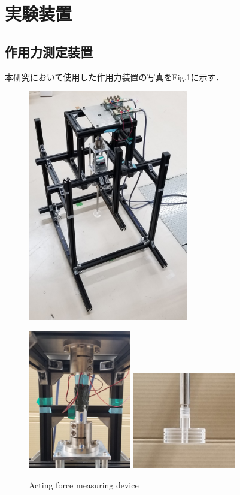 \section{実験装置}

\subsection{作用力測定装置}
本研究において使用した作用力装置の写真をFig.1に示す．

\begin{figure}[htbp]
    \begin{minipage}[b]{0.48\linewidth}
        \centering
        \includegraphics[width=70mm]{images/21-1.png}
    \end{minipage}
    \begin{minipage}[b]{0.42\linewidth}
        \centering
        \includegraphics[width=45mm]{images/21-2.png}
        \includegraphics[width=45mm]{images/21-3.png}
    \end{minipage}
    \caption{Acting force measuring device}
\end{figure}

